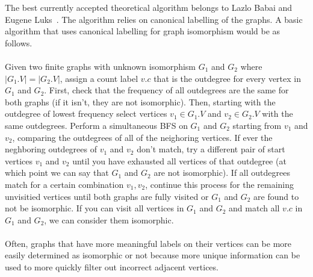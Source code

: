 \documentclass[letterpaper, 12pt]{article}
\begin{document}
    The best currently accepted theoretical algorithm belongs to Lazlo Babai and Eugene Luks~\cite{BabaiLuksGoodAlgorithm}.
    The algorithm relies on canonical labelling of the graphs. A basic algorithm that uses canonical
    labelling for graph isomorphism would be as follows.\\\\
    Given two finite graphs with unknown isomorphism $G_1$ and $G_2$ where $|G_1.V| = |G_2.V|$, assign a count label $v.c$
    that is the outdegree for every vertex in $G_1$ and $G_2$. First, check that the frequency of all
    outdegrees are the same for both graphs (if it isn't, they are not isomorphic). Then,
    starting with the outdegree of lowest frequency
    select vertices $v_1 \in G_1.V$ and $v_2 \in G_2.V$ with the same outdegrees.
    Perform a simultaneous BFS on $G_1$ and $G_2$ starting from $v_1$ and $v_2$, comparing the
    outdegrees of all of the neighoring vertices. If ever the neghboring outdegrees of $v_1$ and $v_2$ don't match, try a different pair
    of start vertices $v_1$ and $v_2$ until you have exhausted all vertices of that outdegree (at which point we
    can say that $G_1$ and $G_2$ are not isomorphic). If all outdegrees match for a certain combination $v_1, v_2$, continue this process
    for the remaining unvisitied vertices until both graphs are fully visited or $G_1$ and $G_2$ are
    found to not be isomorphic. If you can visit all vertices in $G_1$ and $G_2$ and match all $v.c$ in $G_1$
    and $G_2$, we can consider them isomorphic.
    \\\\ Often, graphs that have more meaningful labels on their vertices
    can be more easily determined as isomorphic or not because more unique information can be used to
    more quickly filter out incorrect adjacent vertices.


\pagebreak
{}

\end{document}
